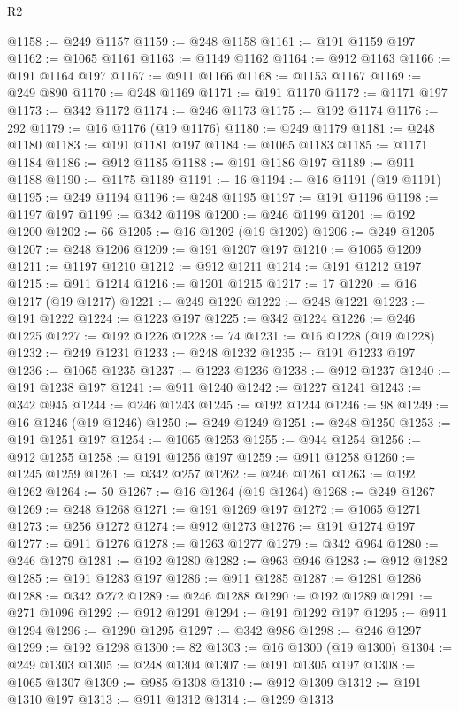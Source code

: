 \begin{lexlean}{R2}
\begin{coremodule}
@1158 := @249 @1157
@1159 := @248 @1158
@1161 := @191 @1159 @197
@1162 := @1065 @1161
@1163 := @1149 @1162
@1164 := @912 @1163
@1166 := @191 @1164 @197
@1167 := @911 @1166
@1168 := @1153 @1167
@1169 := @249 @890
@1170 := @248 @1169
@1171 := @191 @1170
@1172 := @1171 @197
@1173 := @342 @1172
@1174 := @246 @1173
@1175 := @192 @1174
@1176 := 292
@1179 := @16 @1176 (@19 @1176)
@1180 := @249 @1179
@1181 := @248 @1180
@1183 := @191 @1181 @197
@1184 := @1065 @1183
@1185 := @1171 @1184
@1186 := @912 @1185
@1188 := @191 @1186 @197
@1189 := @911 @1188
@1190 := @1175 @1189
@1191 := 16
@1194 := @16 @1191 (@19 @1191)
@1195 := @249 @1194
@1196 := @248 @1195
@1197 := @191 @1196
@1198 := @1197 @197
@1199 := @342 @1198
@1200 := @246 @1199
@1201 := @192 @1200
@1202 := 66
@1205 := @16 @1202 (@19 @1202)
@1206 := @249 @1205
@1207 := @248 @1206
@1209 := @191 @1207 @197
@1210 := @1065 @1209
@1211 := @1197 @1210
@1212 := @912 @1211
@1214 := @191 @1212 @197
@1215 := @911 @1214
@1216 := @1201 @1215
@1217 := 17
@1220 := @16 @1217 (@19 @1217)
@1221 := @249 @1220
@1222 := @248 @1221
@1223 := @191 @1222
@1224 := @1223 @197
@1225 := @342 @1224
@1226 := @246 @1225
@1227 := @192 @1226
@1228 := 74
@1231 := @16 @1228 (@19 @1228)
@1232 := @249 @1231
@1233 := @248 @1232
@1235 := @191 @1233 @197
@1236 := @1065 @1235
@1237 := @1223 @1236
@1238 := @912 @1237
@1240 := @191 @1238 @197
@1241 := @911 @1240
@1242 := @1227 @1241
@1243 := @342 @945
@1244 := @246 @1243
@1245 := @192 @1244
@1246 := 98
@1249 := @16 @1246 (@19 @1246)
@1250 := @249 @1249
@1251 := @248 @1250
@1253 := @191 @1251 @197
@1254 := @1065 @1253
@1255 := @944 @1254
@1256 := @912 @1255
@1258 := @191 @1256 @197
@1259 := @911 @1258
@1260 := @1245 @1259
@1261 := @342 @257
@1262 := @246 @1261
@1263 := @192 @1262
@1264 := 50
@1267 := @16 @1264 (@19 @1264)
@1268 := @249 @1267
@1269 := @248 @1268
@1271 := @191 @1269 @197
@1272 := @1065 @1271
@1273 := @256 @1272
@1274 := @912 @1273
@1276 := @191 @1274 @197
@1277 := @911 @1276
@1278 := @1263 @1277
@1279 := @342 @964
@1280 := @246 @1279
@1281 := @192 @1280
@1282 := @963 @946
@1283 := @912 @1282
@1285 := @191 @1283 @197
@1286 := @911 @1285
@1287 := @1281 @1286
@1288 := @342 @272
@1289 := @246 @1288
@1290 := @192 @1289
@1291 := @271 @1096
@1292 := @912 @1291
@1294 := @191 @1292 @197
@1295 := @911 @1294
@1296 := @1290 @1295
@1297 := @342 @986
@1298 := @246 @1297
@1299 := @192 @1298
@1300 := 82
@1303 := @16 @1300 (@19 @1300)
@1304 := @249 @1303
@1305 := @248 @1304
@1307 := @191 @1305 @197
@1308 := @1065 @1307
@1309 := @985 @1308
@1310 := @912 @1309
@1312 := @191 @1310 @197
@1313 := @911 @1312
@1314 := @1299 @1313

\end{coremodule}
\end{lexlean}
